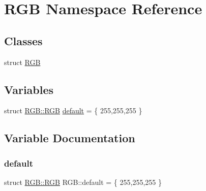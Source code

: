 \hypertarget{namespace_r_g_b}{}\section{R\+GB Namespace Reference}
\label{namespace_r_g_b}
\subsection*{Classes}
\begin{DoxyCompactItemize}
\item 
struct \mbox{\hyperlink{struct_r_g_b_1_1_r_g_b}{R\+GB}}
\end{DoxyCompactItemize}
\subsection*{Variables}
\begin{DoxyCompactItemize}
\item 
struct \mbox{\hyperlink{struct_r_g_b_1_1_r_g_b}{R\+G\+B\+::\+R\+GB}} \mbox{\hyperlink{namespace_r_g_b_a455ee775beb88f63f2ed986b6aefa230}{default}} = \{ 255,255,255 \}
\end{DoxyCompactItemize}


\subsection{Variable Documentation}
\mbox{\label{namespace_r_g_b_a455ee775beb88f63f2ed986b6aefa230}} 
\subsubsection{\texorpdfstring{default}{default}}
{\footnotesize\ttfamily struct \mbox{\hyperlink{struct_r_g_b_1_1_r_g_b}{R\+G\+B\+::\+R\+GB}}  R\+G\+B\+::default = \{ 255,255,255 \}}

